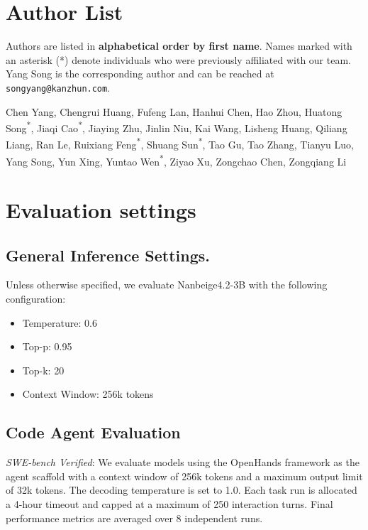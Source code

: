 \section{Author List}

Authors are listed in \textbf{alphabetical order by first name}. Names marked with an asterisk (*) denote individuals who were previously affiliated with our team. Yang Song is the corresponding author and can be reached at \texttt{songyang@kanzhun.com}.

Chen Yang, Chengrui Huang, Fufeng Lan, Hanhui Chen, Hao Zhou, Huatong Song\textsuperscript{*}, Jiaqi Cao\textsuperscript{*}, Jiaying Zhu, Jinlin Niu, Kai Wang, Lisheng Huang, Qiliang Liang, Ran Le, Ruixiang Feng\textsuperscript{*}, Shuang Sun\textsuperscript{*}, Tao Gu, Tao Zhang, Tianyu Luo, Yang Song\textsuperscript{\dag}, Yun Xing, Yuntao Wen\textsuperscript{*}, Ziyao Xu, Zongchao Chen, Zongqiang Li



\section{Evaluation settings}
\label{app:evaluation}

\subsection{General Inference Settings.}

Unless otherwise specified, we evaluate Nanbeige4.2-3B with the following configuration:

\begin{itemize}[leftmargin=1.5em, itemsep=0.2em, topsep=0.4em]
    \item Temperature: 0.6
    \item Top-p: 0.95
    \item Top-k: 20
    \item Context Window: 256k tokens
\end{itemize}

\subsection{Code Agent Evaluation}
\emph{SWE-bench Verified}: We evaluate models using the OpenHands framework as the agent scaffold with a context window of 256k tokens and a maximum output limit of 32k tokens. The decoding temperature is set to 1.0. Each task run is allocated a 4-hour timeout and capped at a maximum of 250 interaction turns. Final performance metrics are averaged over 8 independent runs.

